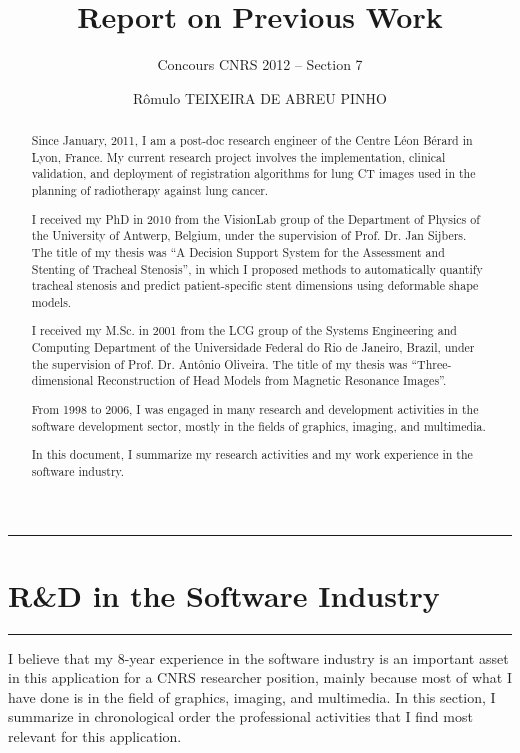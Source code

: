 \documentclass[a4paper]{article}
\title{Report on Previous Work}
\author{Concours CNRS 2012 -- Section 7}
\date{R\^omulo TEIXEIRA DE ABREU PINHO}
\begin{document}
\maketitle

\begin{abstract}
Since January, 2011, I am a post-doc research engineer of the Centre L\'eon B\'erard in Lyon, France. My current research project involves the implementation, clinical validation, and deployment of registration algorithms for lung CT images used in the planning of radiotherapy against lung cancer.

I received my PhD in 2010 from the VisionLab group of the Department of Physics of the University of Antwerp, Belgium, under the supervision of Prof. Dr. Jan Sijbers. The title of my thesis was ``A Decision Support System for the Assessment and Stenting of Tracheal Stenosis'', in which I proposed methods to automatically quantify tracheal stenosis and predict patient-specific stent dimensions using deformable shape models.

I received my M.Sc. in 2001 from the LCG group of the Systems Engineering and Computing Department of the Universidade Federal do Rio de Janeiro, Brazil, under the supervision of Prof. Dr. Ant\^onio Oliveira. The title of my thesis was ``Three-dimensional Reconstruction of Head Models from Magnetic Resonance Images''.

From 1998 to 2006, I was engaged in many research and development activities in the software development sector, mostly in the fields of graphics, imaging, and multimedia. 

In this document, I summarize my research activities and my work experience in the software industry.
\end{abstract}

\tableofcontents

\pagebreak


\hrule
\section{R{\&}D in the Software Industry}
\hrule

\medskip
\medskip

I believe that my 8-year experience in the software industry is an important asset in this application for a CNRS researcher position, mainly because most of what I have done is in the field of graphics, imaging, and multimedia. In this section, I summarize in chronological order the professional activities that I find most relevant for this application. 
\end{document}
